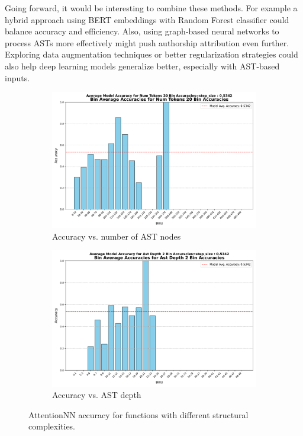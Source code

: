 \documentclass[conference]{IEEEtran}
\begin{document}
Going forward, it would be interesting to combine these methods. For example a hybrid approach using BERT embeddings with Random Forest 
classifier could balance accuracy and efficiency. Also, using graph-based neural networks to process ASTs more effectively might push 
authorship attribution even further. Exploring data augmentation techniques or better regularization strategies could also help deep 
learning models generalize better, especially with AST-based inputs.

\begin{figure}[!b]
    \centering
    \begin{subfigure}{\columnwidth}
        \centering
        \includegraphics[width=\linewidth]{figures/attention_nn/ann_acc_num_nodes.pdf}
        \caption{Accuracy vs. number of AST nodes}
        \label{fig:ann_acc_nodes}
    \end{subfigure}
    \hfill
    \begin{subfigure}{\columnwidth}
        \centering
        \includegraphics[width=\linewidth]{figures/attention_nn/ann_acc_depth.pdf}
        \caption{Accuracy vs. AST depth}
        \label{fig:ann_acc_depth}
    \end{subfigure}
    \caption{AttentionNN accuracy for functions with different structural complexities.}
    \label{fig:ann_acc}
\end{figure}
\end{document}
